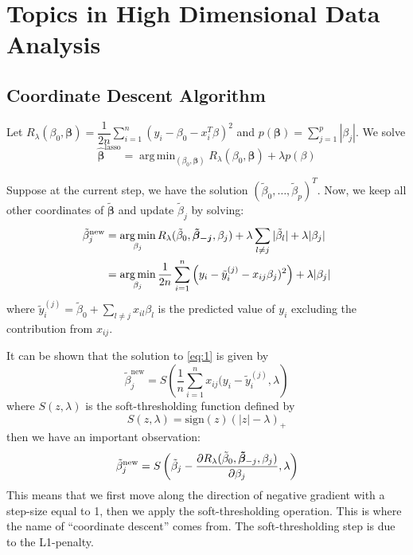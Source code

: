 \documentclass[12pt]{article}
\newcommand{\sumn}{\sum_{i=1}^n}
\newcommand{\btilde}{\tilde{\beta}}
\DeclareMathOperator*{\argmin}{arg\,min}
\numberwithin{equation}{section}
\begin{document}
\newpage
\section{Topics in High Dimensional Data Analysis}
\subsection{Coordinate Descent Algorithm}
Let $R_{\lambda}(\beta_0, \bm{\beta}) = \dfrac{1}{2n} \sumn (y_i - \beta_0 - x_i^T \beta)^2$ and $p(\bm{\beta}) = \sum_{j = 1}^p |\beta_j|$. We solve
\begin{equation*}
  \hat{\bm{\beta}}^{\text{lasso}} = \argmin_{(\beta_0, \bm{\beta})} R_{\lambda}(\beta_0, \bm{\beta}) + \lambda p(\beta)
\end{equation*}

Suppose at the current step, we have the solution $(\btilde_0, \ldots, \btilde_p)^T$. Now, we keep all other coordinates of $\bm{\btilde}$ and update $\btilde_j$ by solving:
\begin{align}
  \btilde_j^{\text{new}} &= \argmin_{\beta_j} R_{\lambda}(\btilde_0, \bm{\btilde_{-j}}, \beta_j) + \lambda \sum_{l \ne j} |\btilde_l| + \lambda |\beta_j| \notag \\
  &= \argmin_{\beta_j} \frac{1}{2n} \sumn \left(
    y_i - \tilde{y}_i^{(j)} - x_{ij} \beta_j)^2 \right) + \lambda |\beta_j| \label{eq:1}
\end{align}
%
where $\tilde{y}_i^(j) = \btilde_0 + \sum_{l \ne j} x_{il} \beta_l$ is the predicted value of $y_i$ excluding the contribution from $x_{ij}$. 

It can be shown that the solution to \eqref{eq:1} is given by
\begin{equation*}
  \btilde_j^{\text{new}} = S \left(
    \frac{1}{n} \sumn x_{ij} (y_i - \tilde{y}_i^{(j)}, \lambda
  \right)
\end{equation*}
%
where $S(z, \lambda)$ is the soft-thresholding function defined by
\begin{equation*}
  S(z, \lambda) = \text{sign}(z)(|z| - \lambda)_{+}
\end{equation*}
%
then we have an important observation:
\begin{equation*}
  \btilde_j^{\text{new}} = S \left(
    \btilde_j - \pdv{R_{\lambda} (\btilde_0, \bm{\btilde}_{-j}, \beta_j)}{\beta_j}, \lambda
  \right)
\end{equation*}
This means that we first move along the direction of negative gradient with a step-size equal to 1, then we apply the soft-thresholding operation. This is
where the name of “coordinate descent” comes from. The soft-thresholding step is due to the L1-penalty.
\end{document}
